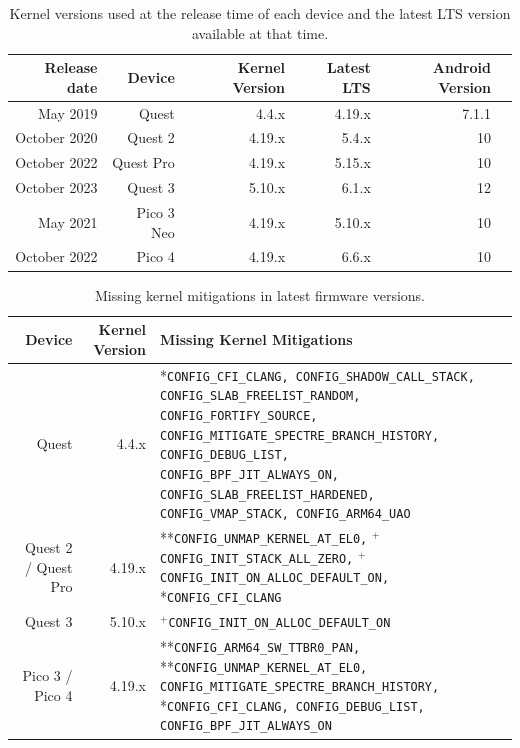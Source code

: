 \documentclass[sigconf]{acmart}
\newcommand{\cc}[1]{\mbox{\smaller[0.5]\texttt{#1}}}
\newcounter{note}[section]
\begin{document}
\begin{table}[]
\footnotesize
\begin{tabular}{rrrrrr}
\toprule
Release date & Device    & Kernel Version  & Latest LTS  & Android Version\\ \midrule
May 2019     & Quest     & 4.4.x    & 4.19.x     &  7.1.1 \\
October 2020 & Quest 2   & 4.19.x   & 5.4.x      &  10\\
October 2022 & Quest Pro & 4.19.x   & 5.15.x     &  10\\
October 2023 & Quest 3   & 5.10.x   & 6.1.x      &  12 \\ May 2021     & Pico 3 Neo & 4.19.x  & 5.10.x     &  10 \\ 
October 2022 & Pico 4    & 4.19.x   & 6.6.x      &  10 \\
\bottomrule
\end{tabular}
\caption{Kernel versions used at the release time of each device and the latest LTS version available at that time.}
\label{t:missing-kernel-lts}
\vspace{-10pt}
\end{table}

\begin{table}[t]
\centering
\footnotesize
\begin{tabular}{rrl}
\toprule
\textbf{Device}    & \textbf{Kernel Version}  & \textbf{Missing Kernel Mitigations} \\ 
\midrule
Quest              & 4.4.x    & \makecell[l]{*\cc{CONFIG\_CFI\_CLANG, CONFIG\_SHADOW\_CALL\_STACK, CONFIG\_SLAB\_FREELIST\_RANDOM,}\\
                                \cc{CONFIG\_FORTIFY\_SOURCE, CONFIG\_MITIGATE\_SPECTRE\_BRANCH\_HISTORY, CONFIG\_DEBUG\_LIST,}\\
                                \cc{CONFIG\_BPF\_JIT\_ALWAYS\_ON, CONFIG\_SLAB\_FREELIST\_HARDENED, CONFIG\_VMAP\_STACK, CONFIG\_ARM64\_UAO}} \\\midrule
Quest 2 / Quest Pro & 4.19.x   & **\cc{CONFIG\_UNMAP\_KERNEL\_AT\_EL0,} $^{+}$ \cc{CONFIG\_INIT\_STACK\_ALL\_ZERO,} $^{+}$\cc{CONFIG\_INIT\_ON\_ALLOC\_DEFAULT\_ON,} *\cc{CONFIG\_CFI\_CLANG} \\\midrule
Quest 3            & 5.10.x   & $^{+}$\cc{CONFIG\_INIT\_ON\_ALLOC\_DEFAULT\_ON} \\\midrule
Pico 3 / Pico 4    & 4.19.x   & \makecell[l]{**\cc{CONFIG\_ARM64\_SW\_TTBR0\_PAN,} **\cc{CONFIG\_UNMAP\_KERNEL\_AT\_EL0, CONFIG\_MITIGATE\_SPECTRE\_BRANCH\_HISTORY,}\\
                                *\cc{CONFIG\_CFI\_CLANG, CONFIG\_DEBUG\_LIST, CONFIG\_BPF\_JIT\_ALWAYS\_ON}} \\
\bottomrule
\end{tabular}
\caption{Missing kernel mitigations in latest firmware versions.
}
\label{t:missing-kernel-configs}
\vspace{-10pt}
\end{table}
\end{document}
